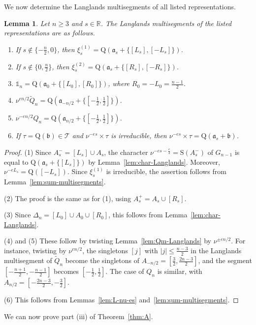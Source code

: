 \documentclass[11pt]{amsart}
\numberwithin{equation}{section}
\theoremstyle{plain}
\newtheorem{lemma}[theorem]{Lemma}
\theoremstyle{definition}
\theoremstyle{remark}
\newcommand{\R}{\mathbb{R}}
\newcommand{\one}{\mathds{1}}
\newcommand{\T}{\mathcal{T}}
\newcommand{\Qt}{\widetilde{Q}}
\newcommand{\xione}{\xi^{(1)}}
\newcommand{\xitwo}{\xi^{(2)}}
\newcommand{\bb}{\mathfrak{b}}
\newcommand{\aaa}{\mathfrak{a}}
\newcommand{\Ss}{\mathrm{S}}
\newcommand{\Qq}{\mathrm{Q}}
\begin{document}
We now determine the Langlands multisegments of all listed representations.

\begin{lemma}\label{lem:Langlands-listed}
	Let $n\ge3$ and $s\in\R$. The Langlands multisegments of the listed representations are as follows.
	\begin{enumerate}
		\item If $s\notin\{-\frac n2,0\}$, then $\xione_s=\Qq(\aaa_s+\{[L_s],[-L_s]\})$.
		\item If $s\notin\{0,\frac n2\}$, then $\xitwo_s=\Qq(\aaa_s+\{[R_s],[-R_s]\})$.
		\item $\one_n=\Qq(\aaa_0+\{[L_0],[R_0]\})$, where $R_0=-L_0=\frac{n-1}2$.
		\item $\nu^{en/2}\Qt_n=\Qq(\aaa_{-n/2}+\{[-\frac12,\frac12]\})$.
		\item $\nu^{-en/2}Q_n=\Qq(\aaa_{n/2}+\{[-\frac12,\frac12]\})$.
		\item If $\tau=\Qq(\bb)\in\T$ and $\nu^{-es}\times\tau$ is irreducible, then $\nu^{-es}\times\tau=\Qq(\aaa_s+\bb)$.
	\end{enumerate}
\end{lemma}

\begin{proof}
	(1) Since $A_s^-=[L_s]\cup A_s$, the character $\nu^{-es-\frac e2}=\Ss(A_s^-)$ of $G_{n-1}$ is equal to $\Qq(\aaa_s+\{[L_s]\})$ by Lemma~\ref{lem:char-Langlands}. Moreover, $\nu^{-eL_s}=\Qq([-L_s])$. Since $\xione_s$ is irreducible, the assertion follows from Lemma~\ref{lem:sum-multisegments}.
	
	(2) The proof is the same as for (1), using $A_s^+=A_s\cup[R_s]$.
	
	(3) Since $\Delta_n=[L_0]\cup A_0\cup[R_0]$, this follows from Lemma~\ref{lem:char-Langlands}.
	
	(4) and (5) These follow by twisting Lemma~\ref{lem:Qm-Langlands} by $\nu^{\pm en/2}$. For instance, twisting by $\nu^{en/2}$, the singletons $[j]$ with $|j|\le\frac{n-3}2$ in the Langlands multisegment of $\Qt_n$ become the singletons of $A_{-n/2}=[\frac32,\frac{2n-3}2]$, and the segment $[-\frac{n+1}2,-\frac{n-1}2]$ becomes $[-\frac12,\frac12]$. The case of $Q_n$ is similar, with $A_{n/2}=[-\frac{2n-3}2,-\frac32]$.
	
	(6) This follows from Lemmas~\ref{lem:L-nu-es} and~\ref{lem:sum-multisegments}.
\end{proof}

We can now prove part (iii) of Theorem~\ref{thm:A}.
\end{document}
